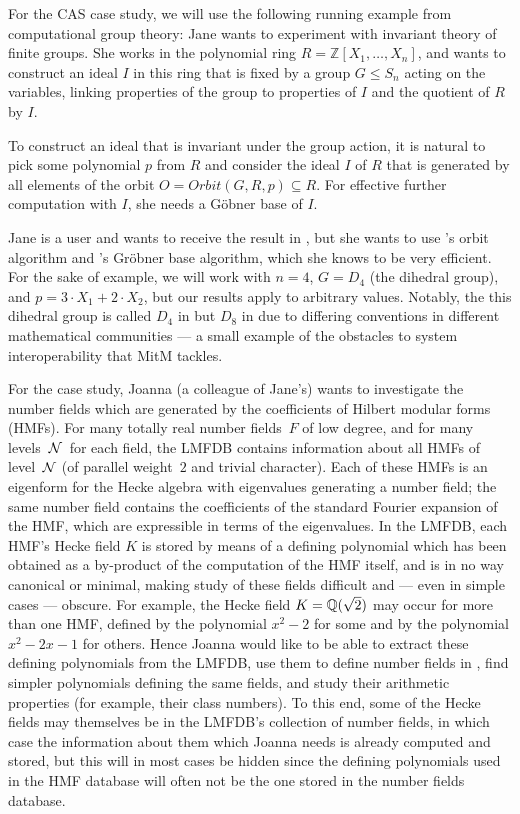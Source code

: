 For the CAS case study, we will use the following running example from computational group theory: Jane wants to experiment with invariant theory of finite groups.
She works in the polynomial ring $R=\mathbb{Z}[X_1,\ldots,X_n]$, and wants to construct an ideal $I$ in this ring that is fixed by a group $G \leq S_n$ acting on the variables, linking properties of the group to properties of $I$ and the quotient of $R$ by $I$.

To construct an ideal that is invariant
under the group action, it is natural to pick some polynomial $p$ from $R$
and consider the ideal $I$ of $R$ that is generated by all elements of the orbit
$O=Orbit(G,R,p)\subseteq R$.
For effective further computation with $I$, she needs a G\"obner base of $I$.

Jane is a \Sage user and wants to receive the result in \Sage, but she wants to
use \GAP's orbit algorithm and \Singular's Gr\"obner base algorithm, which she
knows to be very efficient. For the sake of example, we will work with $n=4$,
$G=D_4$ (the dihedral group), and $p=3\cdot X_1+2\cdot X_2$, but our results apply to
arbitrary values.
Notably, the this dihedral group is called $D_4$ in \Sage but $D_8$ in \GAP due to differing conventions in different mathematical communities --- a small example of the obstacles to system interoperability that MitM tackles.

For the \LMFDB case study, Joanna (a colleague of Jane's) wants to investigate the number fields which are generated by the coefficients of Hilbert modular forms (HMFs).
For many totally real number fields~$F$ of low degree, and for many levels~$\N$\ for each field, the LMFDB contains information about all HMFs of level~$\N$ (of parallel weight~$2$ and trivial character).
Each of these HMFs is an eigenform for the Hecke algebra with eigenvalues generating a number field; the same number field contains the coefficients of the standard Fourier expansion of the HMF, which are expressible in terms of the eigenvalues.
In the LMFDB, each HMF's Hecke field $K$ is stored by means of a defining polynomial which has been obtained as a by-product of the computation of the HMF itself, and is in no way canonical or minimal, making study of these fields difficult and --- even in simple cases --- obscure.
For example, the Hecke field $K=\Q(\sqrt{2})$ may occur for more than one HMF, defined by the polynomial $x^2-2$ for some and by the polynomial $x^2-2x-1$ for others.
Hence Joanna would like to be able to extract these defining polynomials from the LMFDB, use them to define number fields in \Sage, find simpler polynomials defining the same fields, and study their arithmetic properties (for example, their class numbers).
To this end, some of the Hecke fields may themselves be in the LMFDB's collection of number fields, in which case the information about them which Joanna needs is already computed and stored, but this will in most cases be hidden since the defining polynomials used in the HMF database will often not be the one stored in the number fields database.

